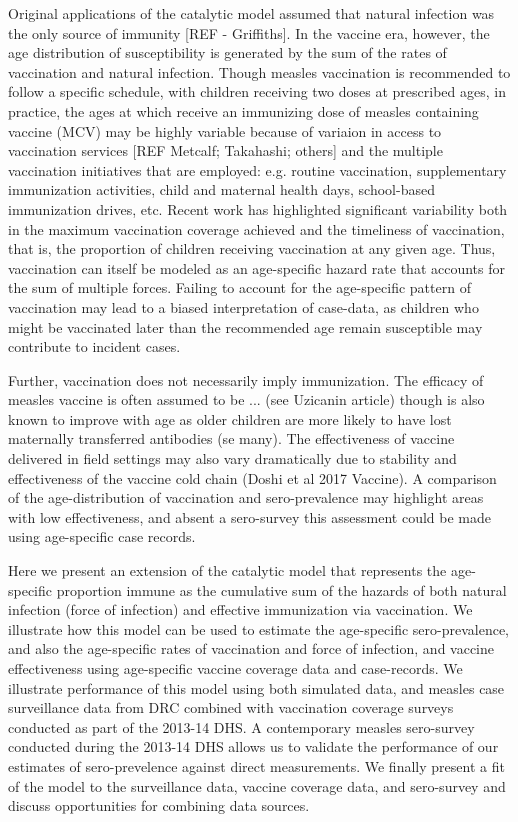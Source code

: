 \documentclass[nofootinbib,aps,pre,twocolumn,superscriptaddress,showkeys,showpacs]{revtex4-1}
\begin{document}
Original applications of the catalytic model assumed that natural infection was the only source of immunity [REF - Griffiths].  
In the vaccine era, however, the age distribution of susceptibility is generated by the sum of the rates of vaccination and natural infection. 
Though measles vaccination is recommended to follow a specific schedule, with children receiving two doses at prescribed ages, in practice, the ages at which receive an immunizing dose of measles containing vaccine (MCV) may be highly variable because of variaion in access to vaccination services [REF Metcalf; Takahashi; others] and the multiple vaccination initiatives that are employed: e.g. routine vaccination, supplementary immunization activities, child and maternal health days, school-based immunization drives, etc.
Recent work has highlighted significant variability both in the maximum vaccination coverage achieved and the timeliness of vaccination, that is, the proportion of children receiving vaccination at any given age.
Thus, vaccination can itself be modeled as an age-specific hazard rate that accounts for the sum of multiple forces.
Failing to account for the age-specific pattern of vaccination may lead to a biased interpretation of case-data, as children who might be vaccinated later than the recommended age remain susceptible may contribute to incident cases. 

Further, vaccination does not necessarily imply immunization.  
The efficacy of measles vaccine is often assumed to be ... (see Uzicanin article) though is also known to improve with age as older children are more likely to have lost maternally transferred antibodies (se many). 
The effectiveness of vaccine delivered in field settings may also vary dramatically due to stability and effectiveness of the vaccine cold chain (Doshi et al 2017 Vaccine).  
A comparison of the age-distribution of vaccination and sero-prevalence may highlight areas with low effectiveness, and absent a sero-survey this assessment could be made using age-specific case records.

Here we present an extension of the catalytic model that represents the age-specific proportion immune as the cumulative sum of the hazards of both natural infection (force of infection) and effective immunization via vaccination.
We illustrate how this model can be used to estimate the age-specific sero-prevalence, and also the age-specific rates of vaccination and force of infection, and vaccine effectiveness using age-specific vaccine coverage data and case-records. 
We illustrate performance of this model using both simulated data, and measles case surveillance data from DRC combined with vaccination coverage surveys conducted as part of the 2013-14 DHS.  
A contemporary measles sero-survey conducted during the 2013-14 DHS allows us to validate the performance of our estimates of sero-prevelence against direct measurements. 
We finally present a fit of the model to the surveillance data, vaccine coverage data, and sero-survey and discuss opportunities for combining data sources.
\end{document}
